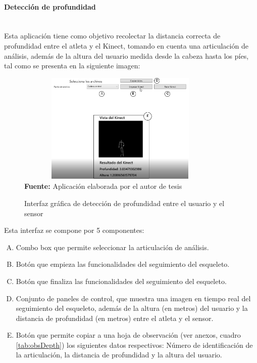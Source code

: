 \paragraph{Detecci\'on de profundidad}\mbox{} \\ \label{ins:UI:wpf:depth}
Esta aplicaci\'on tiene como objetivo recolectar la distancia correcta de profundidad entre el atleta y el Kinect, tomando en cuenta una articulaci\'on de an\'alisis, adem\'as de la altura del usuario medida desde la cabeza hasta los p\'ies, tal como se presenta en la siguiente imagen:
\begin{figure}[H]
	\caption{Interfaz gr\'afica de detecci\'on de profundidad entre el usuario y el sensor}
	\label{fig:appDepth}
	\centering
	\includegraphics[width=380px,height=200px]{graphics/appProfundidad.png} \\
	\textbf{Fuente:} Aplicaci\'on elaborada por el autor de tesis
\end{figure}
Esta interfaz se compone por 5 componentes:
\begin{enumerate}[A.]
    \item Combo box que permite seleccionar la articulaci\'on de an\'alisis.
    \item Bot\'on que empieza las funcionalidades del seguimiento del esqueleto.
    \item Bot\'on que finaliza las funcionalidades del seguimiento del esqueleto.
    \item Conjunto de paneles de control, que muestra una imagen en tiempo real del seguimiento del esqueleto, adem\'as de la altura (en metros) del usuario y la distancia de profundidad (en metros) entre el atleta y el sensor.
        \item Bot\'on que permite copiar a una hoja de observaci\'on (ver anexos, cuadro \ref{tab:obsDepth}) los siguientes datos respectivos: N\'umero de identificaci\'on de la articulaci\'on, la distancia de profundidad y la altura del usuario.
\end{enumerate}

